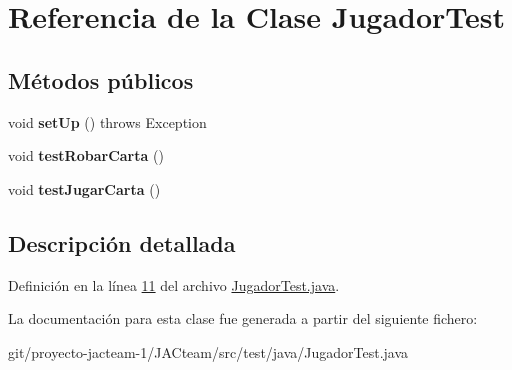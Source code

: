 \hypertarget{class_jugador_test}{}\section{Referencia de la Clase Jugador\+Test}
\label{class_jugador_test}
\subsection*{Métodos públicos}
\begin{DoxyCompactItemize}
\item 
\mbox{\label{class_jugador_test_a0649a94fac544fde5c6905c863484053}} 
void {\bfseries set\+Up} ()  throws Exception 
\item 
\mbox{\label{class_jugador_test_a49b327a10d9341fae7e28d2e8f3752c8}} 
void {\bfseries test\+Robar\+Carta} ()
\item 
\mbox{\label{class_jugador_test_a45d0eb2720b240a87d90d05b7d7c3dae}} 
void {\bfseries test\+Jugar\+Carta} ()
\end{DoxyCompactItemize}


\subsection{Descripción detallada}


Definición en la línea \mbox{\hyperlink{_jugador_test_8java_source_l00011}{11}} del archivo \mbox{\hyperlink{_jugador_test_8java_source}{Jugador\+Test.\+java}}.



La documentación para esta clase fue generada a partir del siguiente fichero\+:\begin{DoxyCompactItemize}
\item 
git/proyecto-\/jacteam-\/1/\+J\+A\+Cteam/src/test/java/Jugador\+Test.\+java\end{DoxyCompactItemize}

